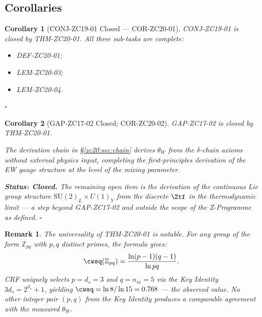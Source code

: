 \documentclass[12pt, a4paper]{article}
\newtheorem{corollary}{Corollary}[section]
\newtheorem{remark}{Remark}[section]
\begin{document}
\subsection{Corollaries}
\label{zc20:sec:corollaries}

\begin{corollary}[CONJ-ZC19-01 Closed --- COR-ZC20-01]
\label{zc20:cor:conj-closed}
CONJ-ZC19-01 is closed by THM-ZC20-01.
All three sub-tasks are complete:
\begin{itemize}[leftmargin=*,noitemsep]
\item[(i)] DEF-ZC20-01;
\item[(ii)] LEM-ZC20-03;
\item[(iii)] LEM-ZC20-04.
\end{itemize}
\hfill$\square$
\end{corollary}

\begin{corollary}[GAP-ZC17-02 Closed; COR-ZC20-02]
\label{zc20:cor:gap-closed}
GAP-ZC17-02 is closed by THM-ZC20-01.

The derivation chain in \S\ref{zc20:sec:chain} derives $\theta_W$ from the $\delta$-chain axioms without external physics input, completing the first-principles derivation of the EW gauge structure at the level of the mixing parameter.

\textbf{Status: Closed.}
The remaining open item is the derivation of the continuous Lie
group structure $\mathrm{SU}(2)_L\times U(1)_Y$ from the discrete
$\Ztf$ in the thermodynamic limit --- a step beyond GAP-ZC17-02
and outside the scope of the Z-Programme as defined.
\hfill$\square$
\end{corollary}

\begin{remark}
The universality of THM-ZC20-01 is notable.
For any group of the form $\mathbb{Z}_{pq}$ with $p, q$ distinct
primes, the formula gives:
\[
  \cwsq(\mathbb{Z}_{pq}) = \frac{\ln(p-1)(q-1)}{\ln pq}.
\]
CRF uniquely selects $p = d_s = 3$ and $q = n_m = 5$ via the Key
Identity $3d_s = 2^{d_s}+1$, yielding
$\cwsq = \ln 8/\ln 15 = 0.768$ --- the observed value.
No other integer pair $(p,q)$ from the Key Identity produces
a comparable agreement with the measured $\theta_W$.
\end{remark}

\end{document}
